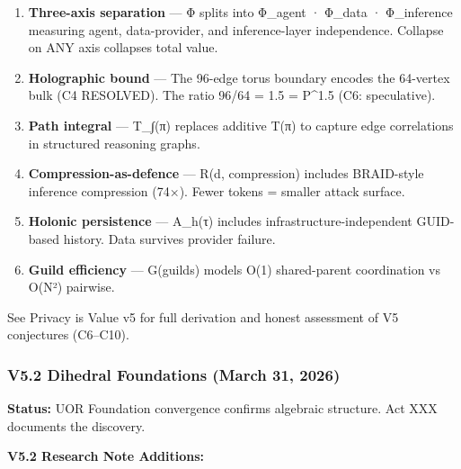 \documentclass[
  11pt,
]{article}
\begin{document}
\begin{enumerate}
\def\labelenumi{\arabic{enumi}.}
\item
  \textbf{Three-axis separation} --- Φ splits into Φ\_agent · Φ\_data ·
  Φ\_inference measuring agent, data-provider, and inference-layer
  independence. Collapse on ANY axis collapses total value.
\item
  \textbf{Holographic bound} --- The 96-edge torus boundary encodes the
  64-vertex bulk (C4 RESOLVED). The ratio 96/64 = 1.5 = P\^{}1.5 (C6:
  speculative).
\item
  \textbf{Path integral} --- T\_∫(π) replaces additive T(π) to capture
  edge correlations in structured reasoning graphs.
\item
  \textbf{Compression-as-defence} --- R(d, compression) includes
  BRAID-style inference compression (74×). Fewer tokens = smaller attack
  surface.
\item
  \textbf{Holonic persistence} --- A\_h(τ) includes
  infrastructure-independent GUID-based history. Data survives provider
  failure.
\item
  \textbf{Guild efficiency} --- G(guilds) models O(1) shared-parent
  coordination vs O(N²) pairwise.
\end{enumerate}

See Privacy is Value v5 for full derivation and honest assessment of V5
conjectures (C6--C10).

\subsubsection{V5.2 Dihedral Foundations (March 31,
2026)}\label{v5.2-dihedral-foundations-march-31-2026}

\textbf{Status:} UOR Foundation convergence confirms algebraic
structure. Act XXX documents the discovery.

\textbf{V5.2 Research Note Additions:}
\end{document}
